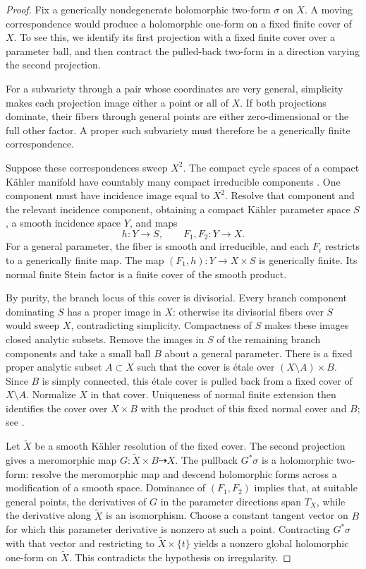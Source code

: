 \begin{proof}
Fix a generically nondegenerate holomorphic two-form \(\sigma\) on
\(X\).  A moving correspondence would produce a holomorphic one-form
on a fixed finite cover of \(X\).  To see this, we identify its first projection
with a fixed finite cover over a parameter ball, and then contract the
pulled-back two-form in a direction varying the second projection.

For a subvariety through a pair whose coordinates are very general,
simplicity makes each projection image either a point or all of \(X\).
If both projections dominate, their fibers through general points are
either zero-dimensional or the full other factor.  A proper such
subvariety must therefore be a generically finite correspondence.

Suppose these correspondences sweep \(X^2\).  The compact cycle spaces
of a compact Kähler manifold have countably many compact irreducible
components \cite{LiebermanCycles}.  One component must have incidence
image equal to \(X^2\).  Resolve that component and the relevant
incidence component, obtaining a compact Kähler parameter space \(S\),
a smooth incidence space \(Y\), and maps
\[
 h:Y\longrightarrow S,\qquad F_1,F_2:Y\longrightarrow X.
\]
For a general parameter, the fiber is smooth and irreducible, and each
\(F_i\) restricts to a generically finite map.  The map
\((F_1,h):Y\to X\times S\) is generically finite.  Its normal finite
Stein factor is a finite cover of the smooth product.

By purity, the branch locus of this cover is divisorial.  Every branch
component dominating \(S\) has a proper image in \(X\): otherwise its
divisorial fibers over \(S\) would sweep \(X\), contradicting
simplicity.  Compactness of \(S\) makes these images closed analytic
subsets.  Remove the images in \(S\) of the remaining branch components
and take a small ball \(B\) about a general parameter.  There is a fixed
proper analytic subset \(A\subset X\) such that the cover is étale
over \((X\setminus A)\times B\).  Since \(B\) is simply connected,
this étale cover is pulled back from a fixed cover of \(X\setminus A\).
Normalize \(X\) in that cover.  Uniqueness of normal finite extension
then identifies the cover over \(X\times B\) with the product of this
fixed normal cover and \(B\); see
\cite[Exposé~XII, Proposition~5.3 and Theorem~5.4]{SGA1}.

Let \(\widetilde X\) be a smooth Kähler resolution of the fixed cover.
The second projection gives a meromorphic map
\(G:\widetilde X\times B\dashrightarrow X\).  The pullback \(G^*\sigma\)
is a holomorphic two-form: resolve the meromorphic map and descend
holomorphic forms across a modification of a smooth space.  Dominance
of \((F_1,F_2)\) implies that, at suitable general points, the
derivatives of \(G\) in the parameter directions span \(T_X\), while
the derivative along \(\widetilde X\) is an isomorphism.  Choose a
constant tangent vector on \(B\) for which this parameter derivative
is nonzero at such a point.  Contracting \(G^*\sigma\) with that vector
and restricting to \(\widetilde X\times\{t\}\) yields a nonzero global
holomorphic one-form on \(\widetilde X\).  This contradicts the
hypothesis on irregularity.


\end{proof}
